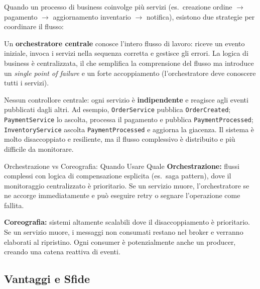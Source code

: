 \documentclass[12pt,a4paper]{report}
\begin{document}
Quando un processo di business coinvolge più servizi (es.\ creazione ordine
$\rightarrow$ pagamento $\rightarrow$ aggiornamento inventario $\rightarrow$
notifica), esistono due strategie per coordinare il flusso:

\begin{description}[style=nextline, leftmargin=1.5cm]
  \item[\textsf{Orchestrazione}]
    Un \textbf{orchestratore centrale} conosce l'intero flusso di lavoro: riceve
    un evento iniziale, invoca i servizi nella sequenza corretta e gestisce gli
    errori. La logica di business è centralizzata, il che semplifica la comprensione
    del flusso ma introduce un \textit{single point of failure} e un forte
    accoppiamento (l'orchestratore deve conoscere tutti i servizi).

  \item[\textsf{Coreografia}]
    Nessun controllore centrale: ogni servizio è \textbf{indipendente} e reagisce
    agli eventi pubblicati dagli altri. Ad esempio, \texttt{OrderService} pubblica
    \texttt{OrderCreated}; \texttt{PaymentService} lo ascolta, processa il
    pagamento e pubblica \texttt{PaymentProcessed}; \texttt{InventoryService}
    ascolta \texttt{PaymentProcessed} e aggiorna la giacenza. Il sistema è molto
    disaccoppiato e resiliente, ma il flusso complessivo è distribuito e più
    difficile da monitorare.
\end{description}

\begin{technicalbox}{Orchestrazione vs Coreografia: Quando Usare Quale}
\textbf{Orchestrazione:} flussi complessi con logica di compensazione esplicita
(es.\ saga pattern), dove il monitoraggio centralizzato è prioritario.
Se un servizio muore, l'orchestratore se ne accorge immediatamente e può
eseguire retry o segnare l'operazione come fallita.

\textbf{Coreografia:} sistemi altamente scalabili dove il disaccoppiamento è
prioritario. Se un servizio muore, i messaggi non consumati restano nel broker
e verranno elaborati al ripristino. Ogni consumer è potenzialmente anche un
producer, creando una catena reattiva di eventi.
\end{technicalbox}

\subsection{Vantaggi e Sfide}
\end{document}
